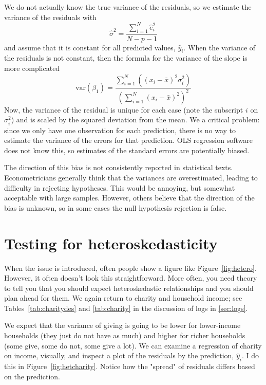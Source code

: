 We do not actually know the true variance of the residuals, so we estimate the variance of the residuals with
\begin{equation}
\hat{\sigma}^2=\frac{\sum_{i=1}^N\hat{e}_i^2}{N-p-1}
\end{equation}
and assume that it is constant for all predicted values, $\hat{y}_i$. When the variance of the residuals is not constant, then the formula for the variance of the slope is more complicated
\begin{equation}
\mbox{var}\left(\beta_1\right)=\frac{\sum_{i=1}^N\left(\left(x_i-\bar{x}\right)^2\sigma_i^2\right)}{\left(\sum_{i=1}^N\left(x_i-\bar{x}\right)^2\right)^2}
\end{equation}
Now, the variance of the residual is unique for each case (note the subscript $i$ on $\sigma_i^2$) and is scaled by the squared deviation from the mean. We a critical problem: since we only have one observation for each prediction, there is no way to estimate the variance of the errors for that prediction. OLS regression software does not know this, so estimates of the standard errors are potentially biased.

The direction of this bias is not consistently reported in statistical texts. Econometricians generally think that the variances are overestimated, leading to difficulty in rejecting hypotheses. This would be annoying, but somewhat acceptable with large samples. However, others believe that the direction of the bias is unknown, so in some cases the null hypothesis rejection is false.

\section{Testing for heteroskedasticity}

When the issue is introduced, often people show a figure like Figure~\ref{fig:hetero}. However, it often doesn't look this straightforward. More often, you need theory to tell you that you should expect heteroskedastic relationships and you should plan ahead for them.  We again return to charity and household income; see Tables~\ref{tab:charitydes} and \ref{tab:charity} in the discussion of logs in \ref{sec:logs}.

We expect that the variance of giving is going to be lower for lower-income households (they just do not have as much) and higher for richer households (some give, some do not, some give a lot). We can examine a regression of charity on income, visually, and inspect a plot of the residuals by the prediction, $\hat{y}_i$. I do this in Figure~\ref{fig:hetcharity}. Notice how the "spread" of residuals differs based on the prediction.

